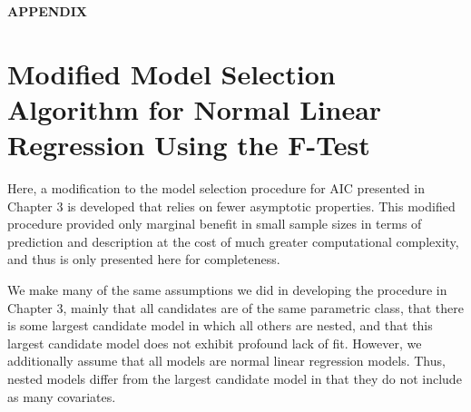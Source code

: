\renewcommand{\theequation}{A.\arabic{equation}}
\setcounter{equation}{0}
\begin{center}
\textbf{APPENDIX}
\end{center}
\doublespace
\phantom{a}
\phantom{a}
\noindent

\section*{Modified Model Selection Algorithm for Normal Linear Regression Using the F-Test}

Here, a modification to the model selection procedure for AIC presented in Chapter 3 is developed that relies on fewer asymptotic properties.
This modified procedure provided only marginal benefit in small sample sizes in terms of prediction and description at the cost of much
greater computational complexity, and thus is only presented here for completeness.

We make many of the same assumptions we did in developing the procedure in Chapter 3, mainly that all candidates are of the same parametric
class, that there is some largest candidate model in which all others are nested, and that this largest candidate model does not exhibit
profound lack of fit. However, we additionally assume that all models are normal linear regression models. Thus, nested models differ
from the largest candidate model in that they do not include as many covariates.

